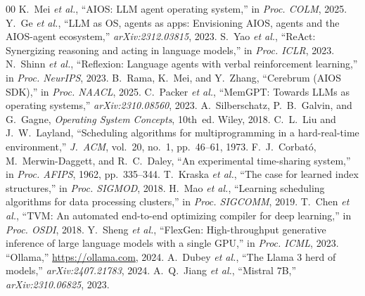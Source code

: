 \documentclass[conference]{IEEEtran}
\begin{document}
\begin{thebibliography}{00}
 K.~Mei \textit{et al.}, ``AIOS: LLM agent operating system,'' in \textit{Proc. COLM}, 2025.
 Y.~Ge \textit{et al.}, ``LLM as OS, agents as apps: Envisioning AIOS, agents and the AIOS-agent ecosystem,'' \textit{arXiv:2312.03815}, 2023.
 S.~Yao \textit{et al.}, ``ReAct: Synergizing reasoning and acting in language models,'' in \textit{Proc. ICLR}, 2023.
 N.~Shinn \textit{et al.}, ``Reflexion: Language agents with verbal reinforcement learning,'' in \textit{Proc. NeurIPS}, 2023.
 B.~Rama, K.~Mei, and Y.~Zhang, ``Cerebrum (AIOS SDK),'' in \textit{Proc. NAACL}, 2025.
 C.~Packer \textit{et al.}, ``MemGPT: Towards LLMs as operating systems,'' \textit{arXiv:2310.08560}, 2023.
 A.~Silberschatz, P.~B.~Galvin, and G.~Gagne, \textit{Operating System Concepts}, 10th~ed. Wiley, 2018.
 C.~L.~Liu and J.~W.~Layland, ``Scheduling algorithms for multiprogramming in a hard-real-time environment,'' \textit{J.~ACM}, vol.~20, no.~1, pp.~46--61, 1973.
 F.~J.~Corbat\'{o}, M.~Merwin-Daggett, and R.~C.~Daley, ``An experimental time-sharing system,'' in \textit{Proc. AFIPS}, 1962, pp.~335--344.
 T.~Kraska \textit{et al.}, ``The case for learned index structures,'' in \textit{Proc. SIGMOD}, 2018.
 H.~Mao \textit{et al.}, ``Learning scheduling algorithms for data processing clusters,'' in \textit{Proc. SIGCOMM}, 2019.
 T.~Chen \textit{et al.}, ``TVM: An automated end-to-end optimizing compiler for deep learning,'' in \textit{Proc. OSDI}, 2018.
 Y.~Sheng \textit{et al.}, ``FlexGen: High-throughput generative inference of large language models with a single GPU,'' in \textit{Proc. ICML}, 2023.
 ``Ollama,'' \url{https://ollama.com}, 2024.
 A.~Dubey \textit{et al.}, ``The Llama 3 herd of models,'' \textit{arXiv:2407.21783}, 2024.
 A.~Q.~Jiang \textit{et al.}, ``Mistral 7B,'' \textit{arXiv:2310.06825}, 2023.
\end{thebibliography}
\end{document}
